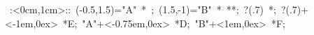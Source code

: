 \hbox{
\xy    <1cm,0cm>:<0cm,1cm>::
       (-0.5,1.5)="A" *{\bullet}  ; (1.5,-1)="B" *{\bullet}  **\dir{-};
       ?(.7) *{\bullet}; ?(.7)+<-1em,0ex> *{E};
       "A"+<-0.75em,0ex> *{D};
       "B"+<1em,0ex> *{F};
       \endxy}
